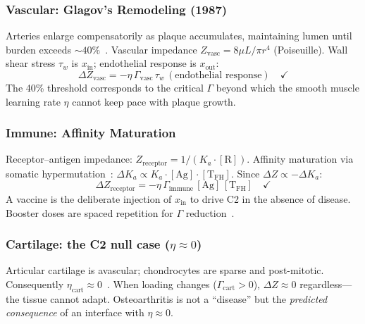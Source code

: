 \documentclass[aps,pre,twocolumn,superscriptaddress,floatfix]{revtex4-2}
\begin{document}
\subsubsection{Vascular: Glagov's Remodeling (1987)}

Arteries enlarge compensatorily as plaque accumulates,
maintaining lumen until burden exceeds
$\sim 40\%$~\cite{Glagov1987}.
Vascular impedance $Z_{\text{vasc}} = 8\mu L / \pi r^4$
(Poiseuille).  Wall shear stress $\tau_w$ is
$x_{\text{in}}$; endothelial response is $x_{\text{out}}$:
\begin{equation}
  \Delta Z_{\text{vasc}}
  = -\eta\,\Gamma_{\text{vasc}}\,
    \tau_w\,(\text{endothelial response})
  \quad \checkmark
  \label{eq:glagov-C2}
\end{equation}
The 40\% threshold corresponds to the critical $\Gamma$
beyond which the smooth muscle learning rate $\eta$ cannot
keep pace with plaque growth.

\subsubsection{Immune: Affinity Maturation}

Receptor--antigen impedance:
$Z_{\text{receptor}} = 1/(K_a \cdot [\text{R}])$.
Affinity maturation via somatic hypermutation~\cite{Victora2012}:
$\Delta K_a \propto K_a \cdot [\text{Ag}] \cdot
[\text{T}_{\text{FH}}]$.
Since $\Delta Z \propto -\Delta K_a$:
\begin{equation}
  \Delta Z_{\text{receptor}}
  = -\eta\,\Gamma_{\text{immune}}\,
    [\text{Ag}]\,[\text{T}_{\text{FH}}]
  \quad \checkmark
  \label{eq:immune-C2}
\end{equation}
A vaccine is the deliberate injection of $x_{\text{in}}$
to drive C2 in the absence of disease.
Booster doses are spaced repetition for $\Gamma$
reduction~\cite{Cepeda2006}.

\subsubsection{Cartilage: the C2 null case ($\eta \approx 0$)}

Articular cartilage is avascular; chondrocytes are sparse
and post-mitotic.  Consequently $\eta_{\text{cart}}
\approx 0$~\cite{Buckwalter2004}.
When loading changes ($\Gamma_{\text{cart}} > 0$),
$\Delta Z \approx 0$ regardless---the tissue cannot adapt.
Osteoarthritis is not a ``disease'' but the
\emph{predicted consequence} of an interface with
$\eta \approx 0$.
\end{document}
